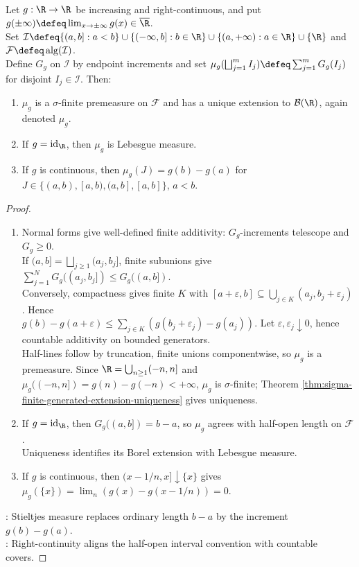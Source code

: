 \begin{theorem} \label{thm:borel-stieltjes-measure-continuous-increasing}\label{thm:borel-stieltjes-measure-generation} \\
Let $g:\R\to\R$ be increasing and right-continuous, and put $g(\pm\infty)\defeq\lim_{x\to\pm\infty}g(x)\in\overline{\R}$.\\
Set $\mathcal{I}\defeq\{(a,b]:a<b\}\cup\{(-\infty,b]:b\in\R\}\cup\{(a,+\infty):a\in\R\}\cup\{\R\}$ and $\mathcal{F}\defeq\operatorname{alg}(\mathcal{I})$.\\
Define $G_g$ on $\mathcal{I}$ by endpoint increments and set $\mu_g(\bigsqcup_{j=1}^{m}I_j)\defeq\sum_{j=1}^{m}G_g(I_j)$ for disjoint $I_j\in\mathcal{I}$. Then:
\begin{enumerate}[label=(\roman*)]
\setlength{\itemsep}{0pt}
\item $\mu_g$ is a $\sigma$-finite premeasure on $\mathcal{F}$ and has a unique extension to $\mathcal{B}(\R)$, again denoted $\mu_g$.
\item If $g=\operatorname{id}_{\R}$, then $\mu_g$ is Lebesgue measure.
\item If $g$ is continuous, then $\mu_g(J)=g(b)-g(a)$ for $J\in\{(a,b),[a,b),(a,b],[a,b]\}$, $a<b$.
\end{enumerate}
\begin{proof}
\begin{enumerate}[label=(\roman*)]
\setlength{\itemsep}{0pt}
\item Normal forms give well-defined finite additivity: $G_g$-increments telescope and $G_g\geq0$.\\
If $(a,b]=\bigsqcup_{j\geq1}(a_j,b_j]$, finite subunions give $\sum_{j=1}^{N}G_g((a_j,b_j])\leq G_g((a,b])$.\\
Conversely, compactness gives finite $K$ with $[a+\varepsilon,b]\subseteq\bigcup_{j\in K}(a_j,b_j+\varepsilon_j)$. Hence\\
$g(b)-g(a+\varepsilon)\leq\sum_{j\in K}(g(b_j+\varepsilon_j)-g(a_j))$. Let $\varepsilon,\varepsilon_j\downarrow0$, hence countable additivity on bounded generators.\\
Half-lines follow by truncation, finite unions componentwise, so $\mu_g$ is a premeasure. Since $\R=\bigcup_{n\geq1}(-n,n]$ and $\mu_g((-n,n])=g(n)-g(-n)<+\infty$, $\mu_g$ is $\sigma$-finite; Theorem \ref{thm:sigma-finite-generated-extension-uniqueness} gives uniqueness.
\item If $g=\operatorname{id}_{\R}$, then $G_g((a,b])=b-a$, so $\mu_g$ agrees with half-open length on $\mathcal{F}$.\\
Uniqueness identifies its Borel extension with Lebesgue measure.
\item If $g$ is continuous, then $(x-1/n,x]\downarrow\{x\}$ gives $\mu_g(\{x\})=\lim_n(g(x)-g(x-1/n))=0$.
\end{enumerate}
: Stieltjes measure replaces ordinary length $b-a$ by the increment $g(b)-g(a)$.\\
: Right-continuity aligns the half-open interval convention with countable covers.
\end{proof}
\end{theorem}

